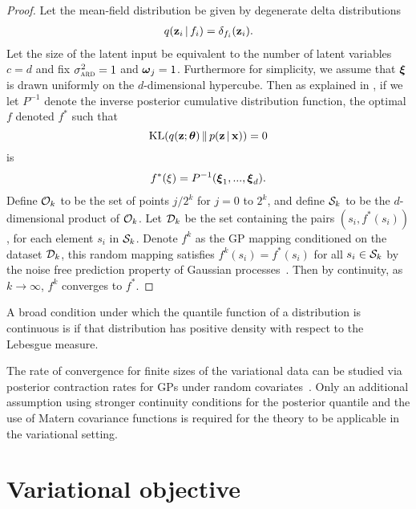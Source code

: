 \begingroup
\def\thetheorem{\ref{theorem:limit}}
\begin{theorem}
\limittheorem
\end{theorem}
\addtocounter{theorem}{-1}
\endgroup
\begin{proof}
Let the mean-field distribution be given by degenerate delta distributions
\begin{align*}
q(\boldsymbol{\mathbf{z}}_i \,|\, f_i) = \delta_{f_i}(\boldsymbol{\mathbf{z}}_i).
\end{align*}
Let the size of the latent input be equivalent to the number of
latent variables $c=d$ and fix $\sigma^2_{\textsc{ard}}=1$ and $\boldsymbol{\mathbf{\omega}}_j=1$. Furthermore for simplicity, we assume that
$\boldsymbol{\mathbf{\xi}}$ is drawn uniformly on the $d$-dimensional hypercube. Then
as explained in ,
if we let $P^{-1}$ denote the inverse posterior cumulative distribution
function, the optimal $f$ denoted $f^*$ such that
\begin{equation*}
\operatorname{KL}(q(\boldsymbol{\mathbf{z}}; \boldsymbol{\mathbf{\theta}}) \,\|\, p(\boldsymbol{\mathbf{z}}\,|\,\boldsymbol{\mathbf{x}}))
= 0
\end{equation*}
is
\begin{align*}
f^*(\xi) = P^{-1}(\boldsymbol{\mathbf{\xi}}_1, ..., \boldsymbol{\mathbf{\xi}}_d).
\end{align*}
Define ${\cal O}_k$ to be the set of points $j/2^k$ for $j = 0$ to $2^k$, and define ${\cal S}_k$ to be the $d$-dimensional product of ${\cal O}_k$. Let
$\mathcal{D}_k$ be the set containing the pairs $(s_i, f^*(s_i))$, for each element $s_i$ in ${\cal S}_k$. Denote $f^k$ as the
\acrshort{GP} mapping conditioned on the dataset $\mathcal{D}_k$, this
random mapping satisfies $f^k(s_i) = f^*(s_i)$ for all $s_i \in {\cal S}_k$ by the noise free prediction
property of Gaussian processes~\citep{rasmussen2006gaussian}.
Then by continuity, as $k \to \infty$, $f^k$  converges to $f^*$.
\end{proof}
A broad condition under which the quantile function of a distribution
is continuous is if that distribution has positive density with
respect to the Lebesgue measure.

The rate of convergence for finite sizes of the variational data
can be studied via posterior contraction rates for \glspl{GP} under random
covariates~\citep{van2011information}. Only an additional assumption using
stronger continuity conditions for the posterior quantile and the use
of Matern covariance functions is required for the theory to be applicable in the variational setting.





\section{Variational objective}
\label{appendix:variational}

